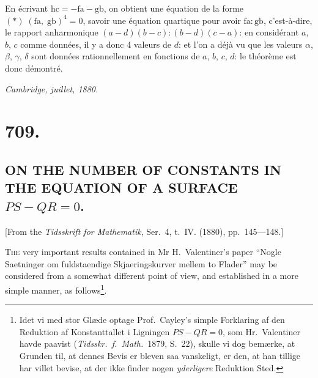 \documentclass[11pt,a4paper]{book}
\begin{document}
En \'ecrivant $\mathrm{hc}=-\mathrm{fa}-\mathrm{gb}$, on obtient une \'equation de la forme $(*)\;(\mathrm{fa},\; \mathrm{gb})^4=0$, savoir une \'equation quartique pour avoir $\mathrm{fa}:\mathrm{gb}$, c'est-\`a-dire, le rapport anharmonique $(a-d)(b-c):(b-d)(c-a)$: en consid\'erant $a$, $b$, $c$ comme donn\'ees, il y a donc 4 valeurs de $d$: et l'on a d\'ej\`a vu que les valeurs $\alpha$, $\beta$, $\gamma$, $\delta$ sont donn\'ees rationnellement en fonctions de $a$, $b$, $c$, $d$: le th\'eor\`eme est donc d\'emontr\'e.

\begin{flushright}
\textit{Cambridge, juillet, 1880.}
\end{flushright}

\cleardoublepage

\section*{709.}
\subsection*{ON THE NUMBER OF CONSTANTS IN THE EQUATION OF A SURFACE\\$PS-QR=0$.}

\begin{center}
[From the \textit{Tidsskrift for Mathematik}, Ser.~4, t.~IV. (1880), pp.~145---148.]
\end{center}
\medskip

\textsc{The} very important results contained in Mr H.~Valentiner's paper ``Nogle Saetninger om fuldstaendige Skjaeringskurver mellem to Flader'' may be considered from a somewhat different point of view, and established in a more simple manner, as follows\footnote{Idet vi med stor Gl\ae de optage Prof.~Cayley's simple Forklaring af den Reduktion af Konstanttallet i Ligningen $PS-QR=0$, som Hr.~Valentiner havde paavist (\textit{Tidsskr.~f.~Math.}\ 1879, S.~22), skulle vi dog bem\ae rke, at Grunden til, at dennes Bevis er bleven saa vanskeligt, er den, at han tillige har villet bevise, at der ikke finder nogen \textit{yderligere} Reduktion Sted.}.
\end{document}
